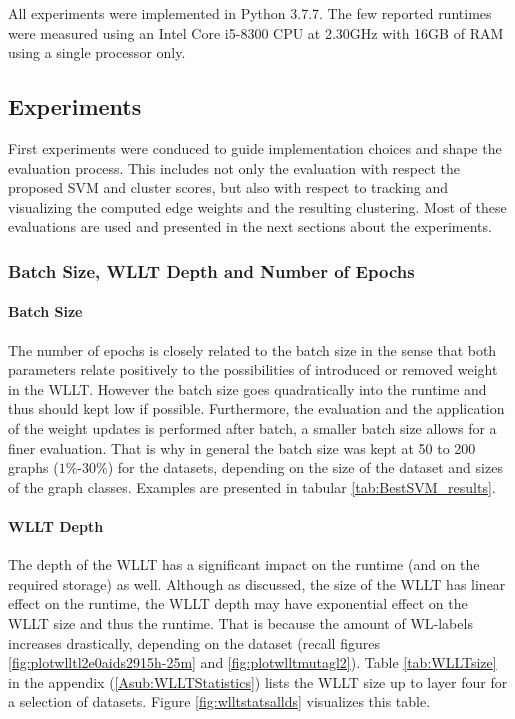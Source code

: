 		All experiments were implemented in Python 3.7.7.
		The few reported runtimes were measured using an Intel Core i5-8300 CPU at 2.30GHz with 16GB of RAM using a single processor only.
	
\subsection{Experiments} \label{subsec:experiments}
		
	First experiments were conduced to guide implementation choices and sha\-pe the evaluation process.
	This includes not only the evaluation with respect the proposed SVM and cluster scores, but also with respect to tracking and visualizing the computed edge weights and the resulting clustering.
	Most of these evaluations are used and presented in the next sections about the experiments.
	
	
	\subsubsection{Batch Size, WLLT Depth and Number of Epochs} \label{subsubsec:exp_eopchs}
	
		\paragraph{Batch Size} The number of epochs is closely related to the batch size in the sense that both parameters relate positively to the possibilities of introduced or removed weight in the WLLT.
		However the batch size goes quadratically into the runtime and thus should kept low if possible.
		Furthermore, the evaluation and the application of the weight updates is performed after batch, a smaller batch size allows for a finer evaluation.
		That is why in general the batch size was kept at 50 to 200 graphs ($1\%$-$30\%$) for the datasets, depending on the size of the dataset and sizes of the graph classes.
		Examples are presented in tabular \ref{tab:BestSVM_results}.
		
		\paragraph{WLLT Depth} The depth of the WLLT has a significant impact on the runtime (and on the required storage) as well.
		Although as discussed, the size of the WLLT has linear effect on the runtime, the WLLT depth may have exponential effect on the WLLT size and thus the runtime.
		That is because the amount of WL-labels increases drastically, depending on the dataset (recall figures \ref{fig:plotwlltl2e0aids2915h-25m} and \ref{fig:plotwlltmutagl2}).
		Table \ref{tab:WLLTsize} in the appendix (\ref{Asub:WLLTStatistics}) lists the WLLT size up to layer four for a selection of datasets.
		Figure \ref{fig:wlltstatsallds} visualizes this table.
		
